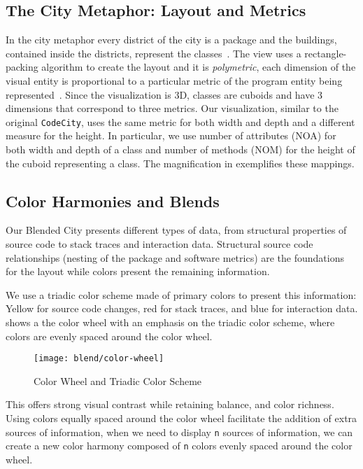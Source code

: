 \subsection{The City Metaphor: Layout and Metrics}

In the city metaphor every  district of the city is a package and the buildings, contained inside the districts, represent the classes~\cite{Wett2007}.
The view uses a rectangle-packing algorithm to create the layout and it is \emph{polymetric}, \ie each dimension of the visual entity is proportional to a particular metric of the program entity being represented~\cite{Lanz2004}.
Since the visualization is 3D, classes are cuboids and have 3 dimensions that correspond to three metrics.
Our visualization, similar to the original \texttt{CodeCity}, uses the same metric for both width and depth and a different measure for the height.
In particular, we use number of attributes (\ie NOA) for both width and depth of a class and number of methods (\ie NOM) for the height of the cuboid representing a class.
The magnification in  exemplifies these mappings.

\subsection{Color Harmonies and Blends}

Our Blended City presents different types of data, from structural properties of source code to stack traces and interaction data.
Structural source code relationships (\ie nesting of the package and software metrics) are the foundations for the layout while colors present the remaining information.

We use a triadic color scheme made of primary colors to present this information: Yellow for source code changes, red for stack traces, and blue for interaction data.
 shows a the color wheel with an emphasis on the triadic color scheme, where colors are evenly spaced around the color wheel.

\begin{figure}[ht]
\centering
\texttt{[image: blend/color-wheel]}
\caption{Color Wheel and Triadic Color Scheme}
\label{fig:color-wheel}
\end{figure}

This offers strong visual contrast while retaining balance, and color richness.
Using colors equally spaced around the color wheel facilitate the addition of extra sources of information, \ie when we need to display \texttt{n} sources of information, we can create a new color harmony composed of \texttt{n} colors evenly spaced around the color wheel.


